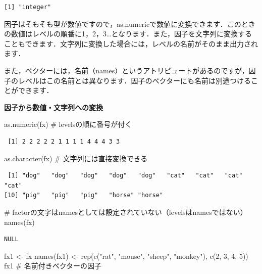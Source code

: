 \documentclass[
  letterpaper,
  DIV=11,
  numbers=noendperiod]{scrreprt}
\newenvironment{Shaded}{\begin{snugshade}}{\end{snugshade}}
\newcommand{\CommentTok}[1]{\textcolor[rgb]{0.37,0.37,0.37}{#1}}
\newcommand{\DecValTok}[1]{\textcolor[rgb]{0.68,0.00,0.00}{#1}}
\newcommand{\FunctionTok}[1]{\textcolor[rgb]{0.28,0.35,0.67}{#1}}
\newcommand{\NormalTok}[1]{\textcolor[rgb]{0.00,0.23,0.31}{#1}}
\newcommand{\OtherTok}[1]{\textcolor[rgb]{0.00,0.23,0.31}{#1}}
\newcommand{\StringTok}[1]{\textcolor[rgb]{0.13,0.47,0.30}{#1}}
\begin{document}
\begin{verbatim}
[1] "integer"
\end{verbatim}

因子はそもそも型が数値ですので，as.numericで数値に変換できます．このときの数値はレベルの順番に1，2，3\ldots となります．また，因子を文字列に変換することもできます．文字列に変換した場合には，レベルの名前がそのまま出力されます．

また，ベクターには，名前（names）というアトリビュートがあるのですが，因子のレベルはこの名前とは異なります．因子のベクターにも名前は別途つけることができます．

\textbf{因子から数値・文字列への変換}

\begin{Shaded}
\begin{Highlighting}[]
\FunctionTok{as.numeric}\NormalTok{(fx) }\CommentTok{\# levelsの順に番号が付く}
\end{Highlighting}
\end{Shaded}

\begin{verbatim}
 [1] 2 2 2 2 2 1 1 1 1 4 4 4 3 3
\end{verbatim}

\begin{Shaded}
\begin{Highlighting}[]
\FunctionTok{as.character}\NormalTok{(fx) }\CommentTok{\# 文字列には直接変換できる}
\end{Highlighting}
\end{Shaded}

\begin{verbatim}
 [1] "dog"   "dog"   "dog"   "dog"   "dog"   "cat"   "cat"   "cat"   "cat"  
[10] "pig"   "pig"   "pig"   "horse" "horse"
\end{verbatim}

\begin{Shaded}
\begin{Highlighting}[]
\CommentTok{\# factorの文字はnamesとしては設定されていない（levelsはnamesではない）}
\FunctionTok{names}\NormalTok{(fx) }
\end{Highlighting}
\end{Shaded}

\begin{verbatim}
NULL
\end{verbatim}

\begin{Shaded}
\begin{Highlighting}[]
\NormalTok{fx1 }\OtherTok{\textless{}{-}}\NormalTok{ fx}
\FunctionTok{names}\NormalTok{(fx1) }\OtherTok{\textless{}{-}} \FunctionTok{rep}\NormalTok{(}\FunctionTok{c}\NormalTok{(}\StringTok{"rat"}\NormalTok{, }\StringTok{"mouse"}\NormalTok{, }\StringTok{"sheep"}\NormalTok{, }\StringTok{"monkey"}\NormalTok{), }\FunctionTok{c}\NormalTok{(}\DecValTok{2}\NormalTok{, }\DecValTok{3}\NormalTok{, }\DecValTok{4}\NormalTok{, }\DecValTok{5}\NormalTok{))}
\NormalTok{fx1 }\CommentTok{\# 名前付きベクターの因子}
\end{Highlighting}
\end{Shaded}
\end{document}
